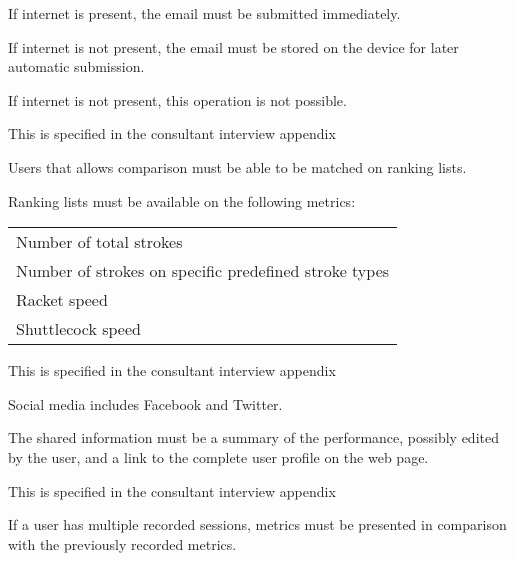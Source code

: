 If internet is present, the email must be submitted immediately.

If internet is not present, the email must be stored on the device for later automatic submission.


If internet is not present, this operation is not possible.


This  is specified in the consultant interview appendix 

Users that allows comparison must be able to be matched on ranking lists.

Ranking lists must be available on the following metrics: \newline
\begin{tabularx}{\textwidth}{X}
    Number of total strokes \\
    Number of strokes on specific predefined stroke types \\
    Racket speed \\
    Shuttlecock speed \\
\end{tabularx}


This  is specified in the consultant interview appendix 

Social media includes Facebook and Twitter.

The shared information must be a summary of the performance, possibly edited by the user, and a link to the complete user profile on the web page.


This  is specified in the consultant interview appendix 

If a user has multiple recorded sessions, metrics must be presented in comparison with the previously recorded metrics.
